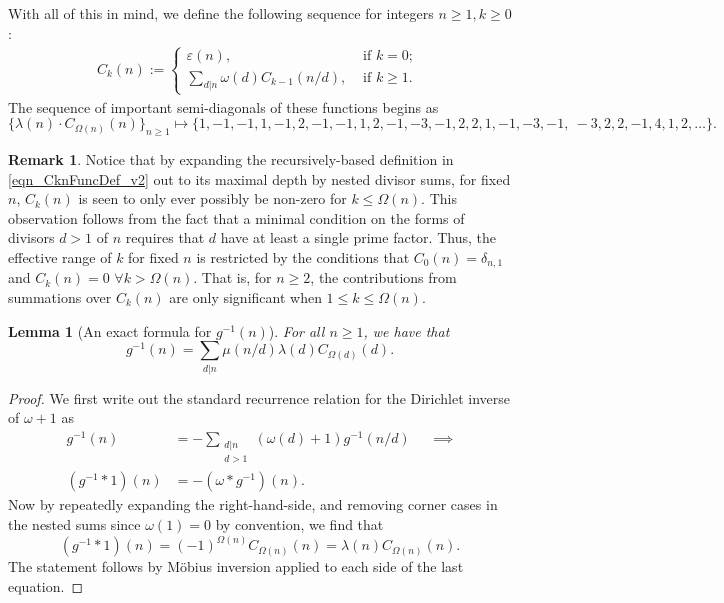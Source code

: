 \documentclass[11pt,reqno,a4letter]{article}
\numberwithin{figure}{section}
\numberwithin{table}{section}
\newcommand{\seqnum}[1]{\href{http://oeis.org/#1}{\color{ProcessBlue}{\underline{#1}}}}
\theoremstyle{plain}
\newtheorem{lemma}[theorem]{Lemma}
\numberwithin{theorem}{section}
\theoremstyle{definition}
\newtheorem{remark}[theorem]{Remark}
\begin{document}
With all of this in mind, we define the following sequence for integers $n \geq 1, k \geq 0$: 
\begin{align} 
\label{eqn_CknFuncDef_v2} 
C_k(n) := \begin{cases} 
     \varepsilon(n), & \text{ if $k = 0$; } \\ 
     \sum\limits_{d|n} \omega(d) C_{k-1}(n/d), & \text{ if $k \geq 1$. } 
     \end{cases} 
\end{align} 
The sequence of important semi-diagonals of these functions begins as 
\cite[\seqnum{A008480}]{OEIS} 
\[
\{\lambda(n) \cdot C_{\Omega(n)}(n) \}_{n \geq 1} \mapsto \{
     1, -1, -1, 1, -1, 2, -1, -1, 1, 2, -1, -3, -1, 2, 2, 1, -1, -3, -1, \
     -3, 2, 2, -1, 4, 1, 2, \ldots \}. 
\]

\begin{remark} 
Notice that by expanding the recursively-based definition in \eqref{eqn_CknFuncDef_v2} 
out to its maximal depth by nested divisor sums, for fixed $n$, $C_k(n)$ is seen to 
only ever possibly be non-zero for $k \leq \Omega(n)$. 
This observation follows from the fact that 
a minimal condition on the forms of 
divisors $d > 1$ of $n$ requires that $d$ have at least a single prime factor. 
Thus, the effective range of $k$ for fixed $n$ is restricted by the 
conditions that $C_0(n) = \delta_{n,1}$ and $C_k(n) = 0$ $\forall k > \Omega(n)$. 
That is, for $n \geq 2$, the contributions from summations over $C_k(n)$ are only 
significant when $1 \leq k \leq \Omega(n)$. 
\end{remark} 

\begin{lemma}[An exact formula for $g^{-1}(n)$] 
\label{lemma_AnExactFormulaFor_gInvByMobiusInv_v1} 
For all $n \geq 1$, we have that 
\[
g^{-1}(n) = \sum_{d|n} \mu(n/d) \lambda(d) C_{\Omega(d)}(d). 
\]
\end{lemma}
\begin{proof} 
We first write out the standard recurrence relation for the Dirichlet inverse of 
$\omega+1$ as 
\begin{align*} 
g^{-1}(n) & = - \sum_{\substack{d|n \\ d>1}} (\omega(d) + 1) g^{-1}(n/d) && \implies \\ 
     (g^{-1} \ast 1)(n) & = -(\omega \ast g^{-1})(n). 
\end{align*} 
Now by repeatedly expanding the right-hand-side, and removing corner cases in the nested sums since 
$\omega(1) = 0$ by convention, we find that 
\[
(g^{-1} \ast 1)(n) = (-1)^{\Omega(n)} C_{\Omega(n)}(n) = \lambda(n) C_{\Omega(n)}(n). 
\]
The statement follows by M\"obius inversion applied to each side of the last equation. 
\end{proof} 
\end{document}
